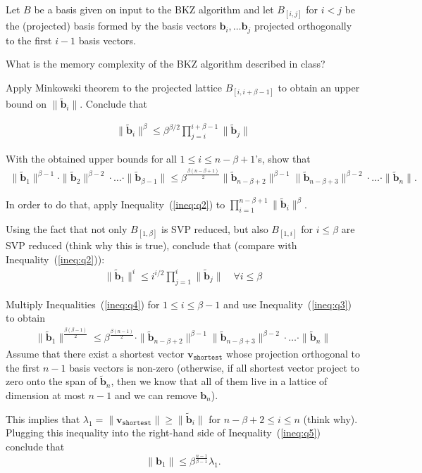 \documentclass[11pt]{exam}
\theoremstyle{definition}
\renewcommand{\vec}{\mathbf}
\begin{document}
Let $B$ be a basis given on input to the BKZ algorithm and let $B_{[i,j]}$ for $i<j$ be the (projected) basis formed by the basis vectors $\vec b_i, \ldots \vec b_j$ projected orthogonally to the first $i-1$ basis vectors. 
\begin{questions}
	
\question What is the memory complexity of the BKZ algorithm described in class?

\question Apply Minkowski theorem to the projected lattice $B_{[i, i+\beta-1]}$ to obtain an upper bound on $	\| \tilde{\vec{b}}_i \|$. Conclude that

\begin{align} \label{ineq:q2}
	\| \tilde{\vec b}_i \|^\beta \leq \beta^{\beta/2} \prod_{j=i}^{i+\beta - 1} \| \tilde{\vec b}_j \|
\end{align}

\question With the obtained upper bounds for all $1 \leq i \leq n-\beta +1$'s, show that
\begin{align}\label{ineq:q3}
\| \tilde{\vec{b}}_1 \|^{\beta-1} \cdot \| \tilde{\vec{b}}_2 \|^{\beta-2} \cdot \ldots \cdot \| \tilde{\vec{b}}_{\beta-1} \| \leq 
\beta^{\frac{\beta(n-\beta+1)}{2}} \| \tilde{\vec{b}}_{n-\beta+2} \|^{\beta-1} \| \tilde{\vec{b}}_{n-\beta+3} \|^{\beta-2} \cdot \ldots \cdot  \|  \tilde{\vec{b}}_n\|.
\end{align}

In order to do that, apply Inequality~(\ref{ineq:q2}) to  $\prod_{i=1}^{n-\beta+1}\|\tilde{\vec b}_i \|^\beta$.

\question Using the fact that not only $B_{[1,\beta]}$ is SVP reduced, but also $B_{[1, i]}$ for $i \leq \beta$ are SVP reduced (think why this is true), conclude that (compare with Inequality~(\ref{ineq:q2})):
\begin{align}\label{ineq:q4}
	\| \tilde{\vec b}_1 \|^i \leq i^{i/2} \prod_{j=1}^{i} \| \tilde{\vec b}_j \| \quad \forall i \leq \beta
\end{align}

\question Multiply Inequalities~(\ref{ineq:q4}) for $1 \leq i \leq \beta -1$ and use Inequality~(\ref{ineq:q3}) to obtain
\begin{align}\label{ineq:q5}
\| \tilde{\vec b}_1 \|^{\frac{\beta(\beta-1)}{2}} \leq \beta^{\frac{\beta(n-1)}{2}} \cdot \| \tilde{\vec{b}}_{n-\beta+2} \|^{\beta-1} \| \tilde{\vec{b}}_{n-\beta+3} \|^{\beta-2} \cdot \ldots \cdot  \|  \tilde{\vec{b}}_n\|
\end{align}
\question 
Assume that there exist a shortest vector $\vec{v}_{\texttt{shortest}}$ whose projection orthogonal to the first $n - 1$ basis vectors is non-zero (otherwise, if all shortest vector project to zero onto the span of $\tilde{\vec b}_{n}$, then we know that all of them live in a lattice of dimension at most $n-1$ and we can remove $\vec b_n$).

This implies that $\lambda_1 = \|\vec{v}_{\texttt{shortest}} \| \geq \| \tilde{\vec b}_i \|$ for $n-\beta+2 \leq i \leq n  $ (think why). Plugging this inequality into the right-hand side of Inequality~(\ref{ineq:q5}) conclude that
\[
	\| \vec b_1 \| \leq \beta^{\frac{n-1}{\beta-1}} \lambda_1.
\]

\end{questions}
\end{document}
